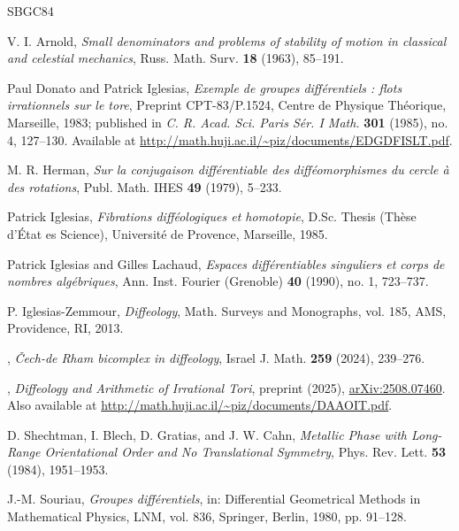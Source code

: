 \documentclass[10pt,letterpaper,reqno]{amsart}
\begin{document}
    \begin{thebibliography}{SBGC84}
      
      V. I. Arnold, \emph{Small denominators and problems of stability of motion in classical and celestial mechanics}, Russ. Math. Surv. \textbf{18} (1963), 85--191.
      
      Paul Donato and Patrick Iglesias,
      \emph{Exemple de groupes différentiels : flots irrationnels sur le tore},
      Preprint CPT-83/P.1524, Centre de Physique Théorique, Marseille, 1983; published in \emph{C. R. Acad. Sci. Paris Sér. I Math.} \textbf{301} (1985), no. 4, 127--130. Available at \url{http://math.huji.ac.il/~piz/documents/EDGDFISLT.pdf}.
      
      M. R. Herman, \emph{Sur la conjugaison différentiable des difféomorphismes du cercle à des rotations}, Publ. Math. IHES \textbf{49} (1979), 5--233.
      
      Patrick Iglesias,
      \emph{Fibrations difféologiques et homotopie},
      D.Sc. Thesis (Thèse d'État es Science), Université de Provence, Marseille, 1985.
      
      Patrick Iglesias and Gilles Lachaud,
      \emph{Espaces différentiables singuliers et corps de nombres algébriques},
      Ann. Inst. Fourier (Grenoble) \textbf{40} (1990), no. 1, 723--737.
      
      P. Iglesias-Zemmour,
      \emph{Diffeology}, Math. Surveys and Monographs, vol. 185, AMS, Providence, RI, 2013.
      
      \bysame,
      \emph{{\v C}ech-de Rham bicomplex in diffeology}, Israel J. Math. \textbf{259} (2024), 239--276.
      
      \bysame,
      \emph{Diffeology and Arithmetic of Irrational Tori},
      preprint (2025), \href{https://arxiv.org/abs/2508.07460}{arXiv:2508.07460}. Also available at \url{http://math.huji.ac.il/~piz/documents/DAAOIT.pdf}.
      
      D. Shechtman, I. Blech, D. Gratias, and J. W. Cahn,
      \emph{Metallic Phase with Long-Range Orientational Order and No Translational Symmetry},
      Phys. Rev. Lett. \textbf{53} (1984), 1951--1953.
      
      J.-M. Souriau,
      \emph{Groupes différentiels}, in: Differential Geometrical Methods in Mathematical Physics, LNM, vol. 836, Springer, Berlin, 1980, pp. 91--128.
    \end{thebibliography}
    
  
\end{document}
